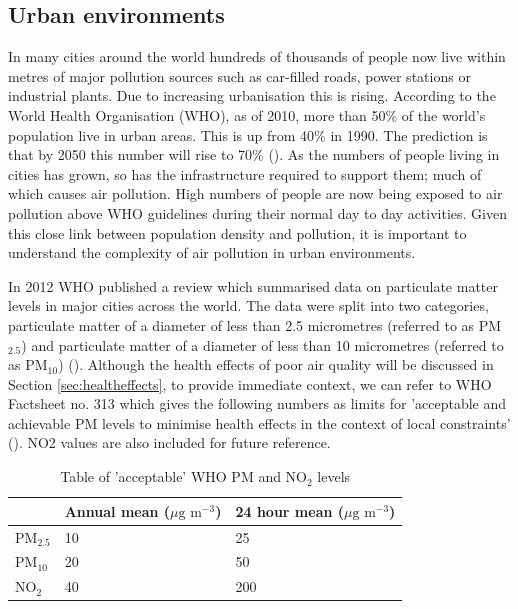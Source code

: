 \subsection{Urban environments}
\label{subsec:urbanenvironments}
In many cities around the world hundreds of thousands of people now live within metres of major pollution sources such as car-filled roads, power stations or industrial plants. Due to increasing urbanisation this is rising. According to the World Health Organisation (WHO), as of 2010, more than 50\% of the world’s population live in urban areas. This is up from 40\% in 1990. The prediction is that by 2050 this number will rise to 70\% (\cite{GlobalHealthObservatory2012}). As the numbers of people living in cities has grown, so has the infrastructure required to support them; much of which causes air pollution. High numbers of people are now being exposed to air pollution above WHO guidelines during their normal day to day activities. Given this close link between population density and pollution, it is important to understand the complexity of air pollution in urban environments.

In 2012 WHO published a review which summarised data on particulate matter levels in major cities across the world. The data were split into two categories, particulate matter of a diameter of less than 2.5 micrometres (referred to as PM$_{2.5}$) and particulate matter of a diameter of less than 10 micrometres (referred  to as PM$_{10}$)  (\cite{WorldHealthOrganization2012}). Although the health effects of poor air quality will be discussed in Section \ref{sec:healtheffects}, to provide immediate context, we can refer to WHO Factsheet no. 313 which gives the following numbers as limits for 'acceptable and achievable PM levels to minimise health effects in the context of local constraints' (\cite{WorldHealthOrganization2011}). NO2 values are also included for future reference.

\begin{table}[H]
\centering
    \begin{tabular}{ | l | l | l |}
    \hline 
     & Annual mean ($\mu \text{g m}^{-3}$) & 24 hour mean ($\mu \text{g m}^{-3}$) \\ \hline
     PM$_{2.5}$ & 10 & 25\\ \hline
     PM$_{10}$ & 20 & 50\\ \hline
     NO$_{2}$ & 40 & 200\\ \hline
    \end{tabular}
\caption{Table of 'acceptable' WHO PM and NO$_{2}$ levels}
\label{tab:whopmlevels}
\end{table}

